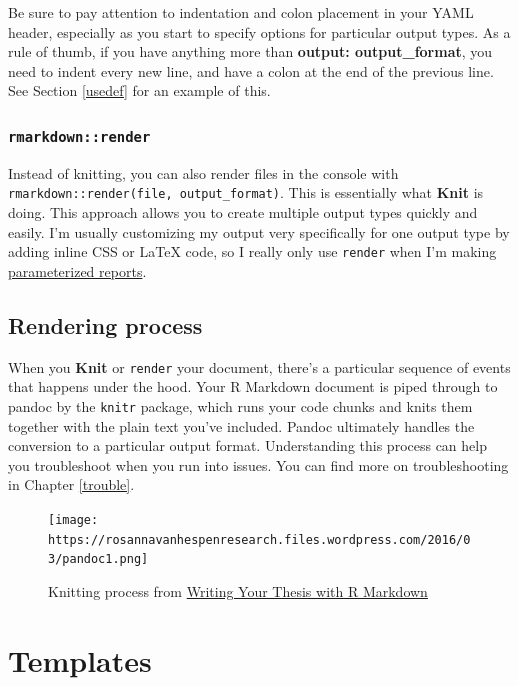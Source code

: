 \documentclass[
]{book}
\begin{document}
Be sure to pay attention to indentation and colon placement in your YAML header, especially as you start to specify options for particular output types. As a rule of thumb, if you have anything more than \textbf{output: output\_format}, you need to indent every new line, and have a colon at the end of the previous line. See Section \ref{usedef} for an example of this.

\hypertarget{rmarkdownrender}{%
\subsection{\texorpdfstring{\texttt{rmarkdown::render}}{rmarkdown::render}}\label{rmarkdownrender}}

Instead of knitting, you can also render files in the console with \texttt{rmarkdown::render(file,\ output\_format)}. This is essentially what \textbf{Knit} is doing. This approach allows you to create multiple output types quickly and easily. I'm usually customizing my output very specifically for one output type by adding inline CSS or LaTeX code, so I really only use \texttt{render} when I'm making \href{https://rmarkdown.rstudio.com/developer_parameterized_reports.html\%23parameter_types\%2F}{parameterized reports}.

\hypertarget{rendering-process}{%
\section{Rendering process}\label{rendering-process}}

When you \textbf{Knit} or \texttt{render} your document, there's a particular sequence of events that happens under the hood. Your R Markdown document is piped through to pandoc by the \texttt{knitr} package, which runs your code chunks and knits them together with the plain text you've included. Pandoc ultimately handles the conversion to a particular output format. Understanding this process can help you troubleshoot when you run into issues. You can find more on troubleshooting in Chapter \ref{trouble}.

\begin{figure}
\centering
\texttt{[image: https://rosannavanhespenresearch.files.wordpress.com/2016/03/pandoc1.png]}
\caption{Knitting process from \href{https://www.rosannavanhespen.nl/thesis_in_rmarkdown/}{Writing Your Thesis with R Markdown}}
\end{figure}

\hypertarget{template}{%
\chapter{Templates}\label{template}}
\end{document}
